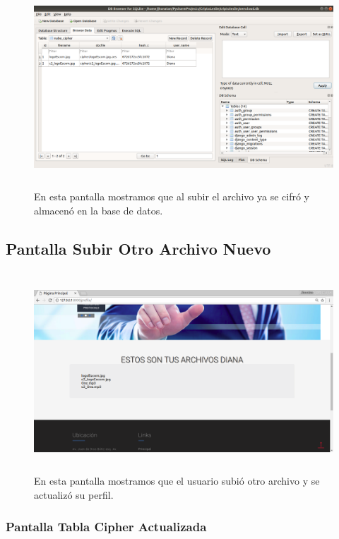 			\begin{figure}[H]
			\centering
			\includegraphics[width=14cm, height=7.5cm]{./images/Implementacion/BDSubirArchivoNuevo2.png}
			\caption{En esta pantalla mostramos que al subir el archivo ya se cifró y almacenó en la base de datos.}
			\label{fig:6-1-15} 
			\end{figure}

\subsection{Pantalla Subir Otro Archivo Nuevo}

			\begin{figure}[H]
			\centering
			\includegraphics[width=14cm, height=7.5cm]{./images/Implementacion/OtroArchivoNuevo.png}
			\caption{En esta pantalla mostramos que el usuario subió otro archivo y se actualizó su perfil.}
			\label{fig:6-1-16} 
			\end{figure}

\subsubsection{Pantalla Tabla Cipher Actualizada }

